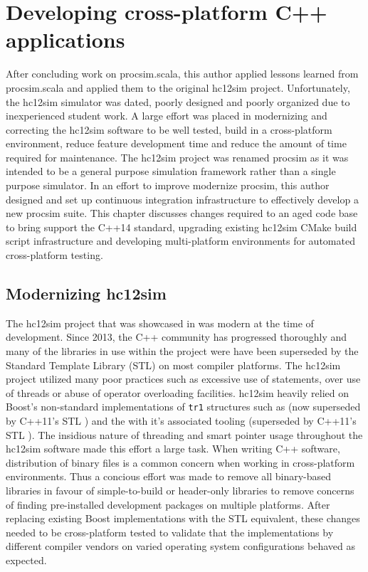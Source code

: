 \chapter{Developing cross-platform C++ applications}
\label{ch:cross-platform}

\newcommand{\cmakeinline}[1]{\texttt{#1}}
    
After concluding work on procsim.scala, this author applied lessons learned from procsim.scala and applied them to the original hc12sim project. Unfortunately, the hc12sim simulator was dated, poorly designed and poorly organized due to inexperienced student work. A large effort was placed in modernizing and correcting the hc12sim software to be well tested, build in a cross-platform environment, reduce feature development time and reduce the amount of time required for maintenance. The hc12sim project was renamed procsim as it was intended to be a general purpose simulation framework rather than a single purpose \hcmodel{} simulator. In an effort to improve modernize procsim, this author designed and set up continuous integration infrastructure to effectively develop a new procsim suite. This chapter discusses changes required to an aged code base to bring support the C++14 standard, upgrading existing hc12sim CMake \cite{Kitware:CMake} build script infrastructure and developing multi-platform environments for automated cross-platform testing.

\section{Modernizing hc12sim}

The hc12sim project that was showcased in \cite{Brightwell2013} was modern at the time of development. Since 2013, the C++ community has progressed thoroughly and many of the libraries in use within the project were have been superseded by the Standard Template Library (STL) on most compiler platforms. The hc12sim project utilized many poor practices such as excessive use of  statements, over use of threads or abuse of operator overloading facilities. hc12sim heavily relied on Boost's non-standard implementations of \verb|tr1| structures such as  \cite{Boost1.53.0:SmartPointers} (now superseded by C++11's STL  \cite{cppreference:shared-ptr}) and the  with it's associated tooling \cite{Boost1.53.0:Thread} (superseded by C++11's STL  \cite{cppreference:thread}). The insidious nature of threading and smart pointer usage throughout the hc12sim software made this effort a large task. When writing C++ software, distribution of binary files is a common concern when working in cross-platform environments. Thus a concious effort was made to remove all binary-based libraries in favour of simple-to-build or header-only libraries to remove concerns of finding pre-installed development packages on multiple platforms. After replacing existing Boost implementations with the STL equivalent, these changes needed to be cross-platform tested to validate that the implementations by different compiler vendors on varied operating system configurations behaved as expected.



